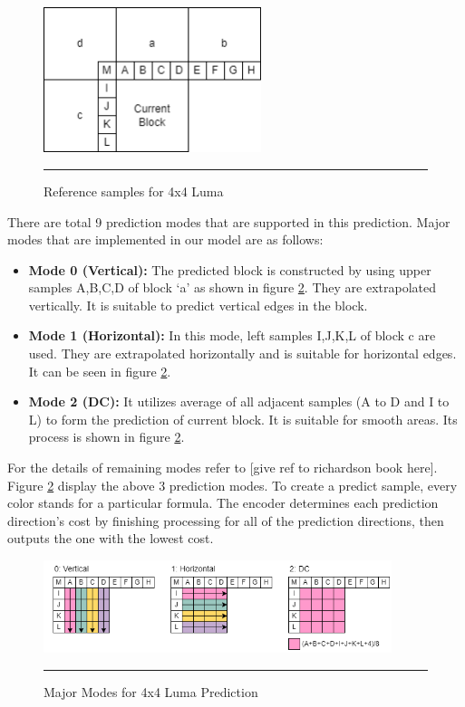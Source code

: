 \begin{figure}[htbp]
	\centering
	\includegraphics[width = 2.5in]{./Figures/4x4luma.png}
	\rule{35em}{0.5pt}
	\caption{Reference samples for 4x4 Luma}
	\label{fig:4x4xluma}
\end{figure}

There are total 9 prediction modes that are supported in this prediction. Major modes that are implemented in our model are as follows:

\begin{itemize}
	\item \textbf{Mode 0 (Vertical):} The predicted block is constructed by using upper samples A,B,C,D of block ‘a’ as shown in figure \ref{fig:3modes}. They are extrapolated vertically. It is suitable to predict vertical edges in the block.
	\item \textbf{Mode 1 (Horizontal):} In this mode, left samples I,J,K,L of block c are used. They are extrapolated horizontally and is suitable for horizontal edges. It can be seen in figure \ref{fig:3modes}.
	\item \textbf{Mode 2 (DC):} It utilizes average of all adjacent samples (A to D and I to L) to form the prediction of current block. It is suitable for smooth areas. Its process is shown in figure \ref{fig:3modes}.

\end{itemize}
	 
For the details of remaining modes refer to [give ref to richardson book here]. Figure \ref{fig:3modes} display the above 3 prediction modes. To create a predict sample, every color stands for a particular formula. The encoder determines each prediction direction's cost by finishing processing for all of the prediction directions, then outputs the one with the lowest cost.

\begin{figure}[htbp]
	\centering
	\includegraphics[width = 4in]{./Figures/3modes.png}
	\rule{35em}{0.5pt}
	\caption{Major Modes for 4x4 Luma Prediction}
	\label{fig:3modes}
\end{figure}

